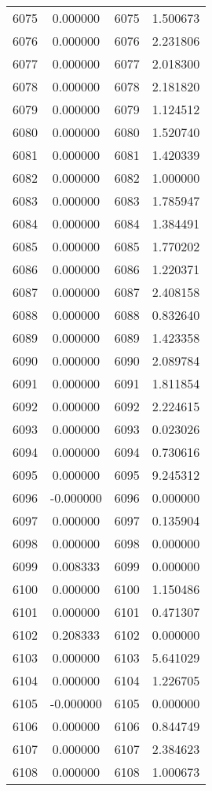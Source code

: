 \documentclass[12pt]{article}
\begin{document}
\begin{longtable}{@{}cccc@{}}
6075 & 0.000000 & 6075 & 1.500673 \\
6076 & 0.000000 & 6076 & 2.231806 \\
6077 & 0.000000 & 6077 & 2.018300 \\
6078 & 0.000000 & 6078 & 2.181820 \\
6079 & 0.000000 & 6079 & 1.124512 \\
6080 & 0.000000 & 6080 & 1.520740 \\
6081 & 0.000000 & 6081 & 1.420339 \\
6082 & 0.000000 & 6082 & 1.000000 \\
6083 & 0.000000 & 6083 & 1.785947 \\
6084 & 0.000000 & 6084 & 1.384491 \\
6085 & 0.000000 & 6085 & 1.770202 \\
6086 & 0.000000 & 6086 & 1.220371 \\
6087 & 0.000000 & 6087 & 2.408158 \\
6088 & 0.000000 & 6088 & 0.832640 \\
6089 & 0.000000 & 6089 & 1.423358 \\
6090 & 0.000000 & 6090 & 2.089784 \\
6091 & 0.000000 & 6091 & 1.811854 \\
6092 & 0.000000 & 6092 & 2.224615 \\
6093 & 0.000000 & 6093 & 0.023026 \\
6094 & 0.000000 & 6094 & 0.730616 \\
6095 & 0.000000 & 6095 & 9.245312 \\
6096 & -0.000000 & 6096 & 0.000000 \\
6097 & 0.000000 & 6097 & 0.135904 \\
6098 & 0.000000 & 6098 & 0.000000 \\
6099 & 0.008333 & 6099 & 0.000000 \\
6100 & 0.000000 & 6100 & 1.150486 \\
6101 & 0.000000 & 6101 & 0.471307 \\
6102 & 0.208333 & 6102 & 0.000000 \\
6103 & 0.000000 & 6103 & 5.641029 \\
6104 & 0.000000 & 6104 & 1.226705 \\
6105 & -0.000000 & 6105 & 0.000000 \\
6106 & 0.000000 & 6106 & 0.844749 \\
6107 & 0.000000 & 6107 & 2.384623 \\
6108 & 0.000000 & 6108 & 1.000673 \\

\end{longtable}
\end{document}
